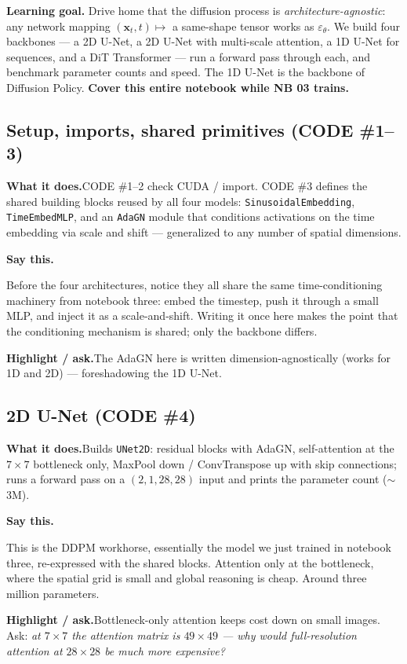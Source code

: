 \documentclass[11pt]{article}
\newenvironment{saythis}{%
  \par\smallskip\noindent
  \begin{list}{}{%
    \setlength{\leftmargin}{1.2em}%
    \setlength{\rightmargin}{0.5em}%
    \setlength{\topsep}{2pt}%
  }\item\relax
  \color{sayrule}\textbf{Say this.}\hspace{0.4em}\color{black}\itshape
}{%
  \end{list}\par\smallskip
}
\newcommand{\highlight}[1]{\par\smallskip\noindent\textcolor{hlcolor}{\textbf{Highlight / ask.}}\hspace{0.4em}#1\par\smallskip}
\newcommand{\whatdoes}[1]{\par\noindent\textbf{What it does.}\hspace{0.4em}#1\par}
\begin{document}
\textbf{Learning goal.} Drive home that the diffusion process is \emph{architecture-agnostic}: any
network mapping $(\mathbf{x}_t, t)\mapsto$ a same-shape tensor works as $\varepsilon_\theta$. We build
four backbones --- a 2D U-Net, a 2D U-Net with multi-scale attention, a 1D U-Net for sequences, and a
DiT Transformer --- run a forward pass through each, and benchmark parameter counts and speed. The 1D
U-Net is the backbone of Diffusion Policy. \textbf{Cover this entire notebook while NB 03 trains.}

\subsection{Setup, imports, shared primitives (CODE \#1--3)}
\whatdoes{CODE \#1--2 check CUDA / import. CODE \#3 defines the shared building blocks reused by all four
models: \texttt{SinusoidalEmbedding}, \texttt{TimeEmbedMLP}, and an \texttt{AdaGN} module that conditions
activations on the time embedding via scale and shift --- generalized to any number of spatial dimensions.}
\begin{saythis}
Before the four architectures, notice they all share the same time-conditioning machinery from notebook
three: embed the timestep, push it through a small MLP, and inject it as a scale-and-shift. Writing it
once here makes the point that the conditioning mechanism is shared; only the backbone differs.
\end{saythis}
\highlight{The AdaGN here is written dimension-agnostically (works for 1D and 2D) --- foreshadowing the
1D U-Net.}

\subsection{2D U-Net (CODE \#4)}
\whatdoes{Builds \texttt{UNet2D}: residual blocks with AdaGN, self-attention at the $7\times7$ bottleneck
only, MaxPool down / ConvTranspose up with skip connections; runs a forward pass on a
$(2,1,28,28)$ input and prints the parameter count ($\sim$3M).}
\begin{saythis}
This is the DDPM workhorse, essentially the model we just trained in notebook three, re-expressed with
the shared blocks. Attention only at the bottleneck, where the spatial grid is small and global
reasoning is cheap. Around three million parameters.
\end{saythis}
\highlight{Bottleneck-only attention keeps cost down on small images. Ask: \emph{at $7\times7$ the
attention matrix is $49\times49$ --- why would full-resolution attention at $28\times28$ be much more
expensive?}}
\end{document}
